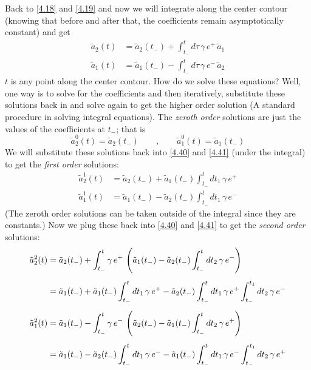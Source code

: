 \documentclass[12pt,a4paper]{article}
\begin{document}
	Back to \eqref{4.18} and \eqref{4.19} and now we will integrate along the center contour (knowing that before and after that, the coefficients remain asymptotically constant) and get
	\begin{align}
		\tilde{a}_{2}(t) &= \tilde{a}_{2}(t_{-}) + \int_{t_{-}}^{t} d\tau\, \gamma\, e^{+}\, \tilde{a}_{1} \label{4.40} \\[5pt]
		\tilde{a}_{1}(t) &= \tilde{a}_{1}(t_{-}) - \int_{t_{-}}^{t} d\tau\, \gamma\, e^{-}\, \tilde{a}_{2} \label{4.41}
	\end{align}
	$t$ is any point along the center contour. How do we solve these equations? Well, one way is to solve for the coefficients and then iteratively, substitute these solutions back in and solve again to get the higher order solution (A standard procedure in solving integral equations). The \emph{zeroth order} solutions are just the values of the coefficients at $t_{-}$; that is
	\begin{equation}
		\tilde{a}_{2}^{0}(t) = \tilde{a}_{2}(t_{-}) \qquad , \qquad \tilde{a}_{1}^{0}(t) = \tilde{a}_{1}(t_{-}) \label{4.42}
	\end{equation}
	We will substitute these solutions back into \eqref{4.40} and \eqref{4.41} (under the integral) to get the \emph{first order} solutions:
	\begin{align}
		\tilde{a}_{2}^{1}(t) &= \tilde{a}_{2}(t_{-}) + \tilde{a}_{1}(t_{-}) \int_{t_{-}}^{t} dt_{1}\, \gamma\, e^{+} \label{4.43} \\[5pt]
		\tilde{a}_{1}^{1}(t) &= \tilde{a}_{1}(t_{-}) - \tilde{a}_{2}(t_{-}) \int_{t_{-}}^{t} dt_{1}\, \gamma\, e^{-} \label{4.44}
	\end{align}
	(The zeroth order solutions can be taken outside of the integral since they are constants.) Now we plug these back into \eqref{4.40} and \eqref{4.41} to get the \emph{second order} solutions:
	\begin{align}
		\tilde{a}_{2}^{2}(t) &= \tilde{a}_{2}(t_{-}) + \int_{t_{-}}^{t} \gamma\, e^{+}\, \left( \tilde{a}_{1}(t_{-}) - \tilde{a}_{2}(t_{-}) \int_{t_{-}}^{t} dt_{2}\, \gamma\, e^{-} \right) \notag \\[5pt]
		&= \tilde{a}_{1}(t_{-}) + \tilde{a}_{1}(t_{-}) \int_{t_{-}}^{t} dt_{1}\, \gamma\, e^{+} - \tilde{a}_{2}(t_{-}) \int_{t_{-}}^{t} dt_{1}\, \gamma\, e^{+} \int_{t_{-}}^{t_{1}} dt_{2}\, \gamma\, e^{-} \label{4.45} \\[5pt]
		\tilde{a}_{1}^{2}(t) &= \tilde{a}_{1}(t_{-}) - \int_{t_{-}}^{t} \gamma\, e^{-}\, \left( \tilde{a}_{2}(t_{-}) - \tilde{a}_{1}(t_{-}) \int_{t_{-}}^{t} dt_{2}\, \gamma\, e^{+} \right) \notag \\[5pt]
		&= \tilde{a}_{1}(t_{-}) - \tilde{a}_{2}(t_{-}) \int_{t_{-}}^{t} dt_{1}\, \gamma\, e^{-} -  \tilde{a}_{1}(t_{-}) \int_{t_{-}}^{t} dt_{1}\, \gamma\, e^{-} \int_{t_{-}}^{t_{1}} dt_{2}\, \gamma\, e^{+} \label{4.46}
	\end{align}
\end{document}
